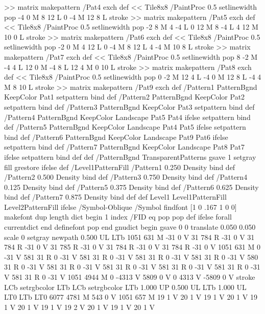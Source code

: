 {{{>> matrix makepattern
/Pat4 exch def
<< Tile8x8
 /PaintProc {0.5 setlinewidth pop -4 0 M 8 12 L
	0 -4 M 12 8 L stroke}
>> matrix makepattern
/Pat5 exch def
<< Tile8x8
 /PaintProc {0.5 setlinewidth pop -2 8 M 4 -4 L
	0 12 M 8 -4 L 4 12 M 10 0 L stroke}
>> matrix makepattern
/Pat6 exch def
<< Tile8x8
 /PaintProc {0.5 setlinewidth pop -2 0 M 4 12 L
	0 -4 M 8 12 L 4 -4 M 10 8 L stroke}
>> matrix makepattern
/Pat7 exch def
<< Tile8x8
 /PaintProc {0.5 setlinewidth pop 8 -2 M -4 4 L
	12 0 M -4 8 L 12 4 M 0 10 L stroke}
>> matrix makepattern
/Pat8 exch def
<< Tile8x8
 /PaintProc {0.5 setlinewidth pop 0 -2 M 12 4 L
	-4 0 M 12 8 L -4 4 M 8 10 L stroke}
>> matrix makepattern
/Pat9 exch def
/Pattern1 {PatternBgnd KeepColor Pat1 setpattern} bind def
/Pattern2 {PatternBgnd KeepColor Pat2 setpattern} bind def
/Pattern3 {PatternBgnd KeepColor Pat3 setpattern} bind def
/Pattern4 {PatternBgnd KeepColor Landscape {Pat5} {Pat4} ifelse setpattern} bind def
/Pattern5 {PatternBgnd KeepColor Landscape {Pat4} {Pat5} ifelse setpattern} bind def
/Pattern6 {PatternBgnd KeepColor Landscape {Pat9} {Pat6} ifelse setpattern} bind def
/Pattern7 {PatternBgnd KeepColor Landscape {Pat8} {Pat7} ifelse setpattern} bind def
} def
%
%
%
/PatternBgnd {
  TransparentPatterns {} {gsave 1 setgray fill grestore} ifelse
} def
%
%
/Level1PatternFill {
/Pattern1 {0.250 Density} bind def
/Pattern2 {0.500 Density} bind def
/Pattern3 {0.750 Density} bind def
/Pattern4 {0.125 Density} bind def
/Pattern5 {0.375 Density} bind def
/Pattern6 {0.625 Density} bind def
/Pattern7 {0.875 Density} bind def
} def
%
%
Level1 {Level1PatternFill} {Level2PatternFill} ifelse
%
/Symbol-Oblique /Symbol findfont [1 0 .167 1 0 0] makefont
dup length dict begin {1 index /FID eq {pop pop} {def} ifelse} forall
currentdict end definefont pop
end
gnudict begin
gsave
0 0 translate
0.050 0.050 scale
0 setgray
newpath
0.500 UL
LTb
1051 631 M
-31 0 V
31 784 R
-31 0 V
31 784 R
-31 0 V
31 785 R
-31 0 V
31 784 R
-31 0 V
31 784 R
-31 0 V
1051 631 M
0 -31 V
581 31 R
0 -31 V
581 31 R
0 -31 V
581 31 R
0 -31 V
581 31 R
0 -31 V
580 31 R
0 -31 V
581 31 R
0 -31 V
581 31 R
0 -31 V
581 31 R
0 -31 V
581 31 R
0 -31 V
581 31 R
0 -31 V
1051 4944 M
0 -4313 V
5809 0 V
0 4313 V
-5809 0 V
stroke
LCb setrgbcolor
LTb
LCb setrgbcolor
LTb
1.000 UP
0.500 UL
LTb
1.000 UL
LT0
LTb
LT0
6077 4781 M
543 0 V
1051 657 M
19 1 V
20 1 V
19 1 V
20 1 V
19 1 V
20 1 V
19 1 V
19 2 V
20 1 V
19 1 V
20 1 V
}}
